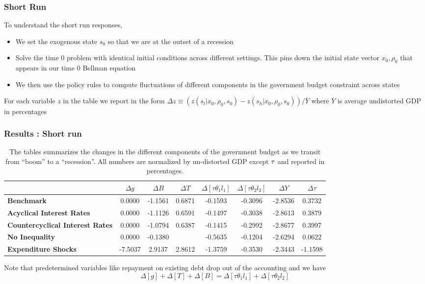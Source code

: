 \documentclass{beamer}
\begin{document}
 \begin{frame}
  \frametitle{Short Run}
  To understand the short run responses, 
  \begin{itemize}
   \item   We set the exogenous state $s_0$ so  that we are at the outset of a recession
   \item Solve the time 0 problem with identical initial conditions across
different settings. This pins down the initial state vector  $x_0,\rho_0$  that appears in our time $0$ Bellman equation
\item We then use the policy rules to compute fluctuations of
different components in the government budget constraint across states
  \end{itemize}
For each variable
$z$ in the table we report in the form $\Delta z\equiv \left( z\left(
s_l|x_0,\rho_0,s_0\right) -z\left( s_h|x_0,\rho_0,s_0\right) \right) /\bar{Y}
$ where $\bar{Y}$ is average undistorted GDP in percentages
 \end{frame}

 
 \begin{frame}
 \frametitle{Results : Short run}
 {\tiny
\begin{table}[tbp]
\begin{tabular}{|l|c|c|c|c|c|c|c|}
\hline
& \textbf{$\Delta g$} & \textbf{$\Delta B$} & \textbf{$\Delta T$} & \textbf{$%
\Delta [\tau\theta_1l_1]$} & \textbf{$\Delta [\tau\theta_2l_2]$} & \textbf{$%
\Delta Y$} & \textbf{$\Delta \tau$} \\ \hline
\textbf{Benchmark} & 0.0000 & -1.1561 & 0.6871 & -0.1593 & -0.3096 & -2.8536
& 0.3732 \\ \hline
\textbf{Acyclical Interest Rates} & 0.0000 & -1.1126 & 0.6591 & -0.1497 &
-0.3038 & -2.8613 & 0.3879 \\ \hline
\textbf{Countercyclical Interest Rates} & 0.0000 & -1.0794 & 0.6387 & -0.1415 &
-0.2992 & -2.8677 & 0.3997 \\ \hline
\textbf{No Inequality} & 0.0000 & -0.1380 &\color{red}{\textbf{ -0.5459}} & -0.5635 & -0.1204 &
-2.6294 & 0.0622 \\ \hline
\textbf{Expenditure Shocks} & -7.5037 & 2.9137 & 2.8612 & -1.3759 & -0.3530 & -2.3443 &
-1.1598 \\ \hline

\end{tabular}%

\caption{The tables summarizes the changes in the different components of the government budget as we transit from ``boom'' to a ``recession''.  All numbers are normalized by un-distorted GDP except $\protect\tau $ and reported in percentages.
}

\label{tab:ShortRunPolicyResponses}
\end{table}
}
Note that predetermined variables like repayment on existing debt drop out
of the accounting and we have
\begin{equation*}
\Delta [g]+\Delta[T]+ \Delta [B]=\Delta[\tau \theta_1 l_1]+ \Delta[\tau
\theta_2 l_2]
\end{equation*}%

 \end{frame}
\end{document}
